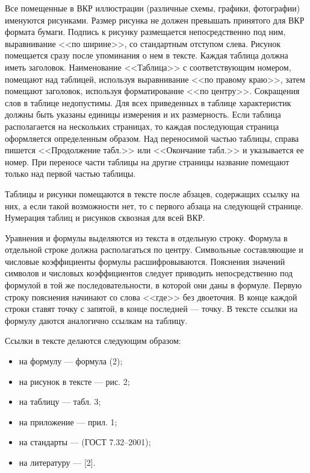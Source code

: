 \documentclass[14pt]{extarticle} %
\begin{document}

Все помещенные в ВКР иллюстрации (различные схемы, графики, фотографии) именуются рисунками. Размер рисунка не должен превышать принятого для ВКР формата бумаги. Подпись к рисунку размещается непосредственно под ним, выравнивание <<по ширине>>, со стандартным отступом слева. Рисунок помещается сразу после упоминания о нем в тексте. Каждая таблица должна иметь заголовок. Наименование <<Таблица>> с соответствующим номером, помещают над таблицей, используя выравнивание <<по правому краю>>, затем помещают заголовок, используя форматирование <<по центру>>. Сокращения слов в таблице недопустимы. Для всех приведенных в таблице характеристик должны быть указаны единицы измерения и их размерность. Если таблица располагается на нескольких страницах, то каждая последующая страница оформляется определенным образом. Над переносимой частью таблицы, справа пишется <<Продолжение табл.>> или <<Окончание табл.>> и указывается ее номер. При переносе части таблицы на другие страницы название помещают только над первой частью таблицы.

Таблицы и рисунки помещаются в тексте после абзацев, содержащих ссылку на них, а если такой возможности нет, то с первого абзаца на следующей странице. Нумерация таблиц и рисунков сквозная для всей ВКР.

Уравнения и формулы выделяются из текста в отдельную строку. Формула в отдельной строке должна располагаться по центру. Символьные составляющие и числовые коэффициенты формулы расшифровываются. Пояснения значений символов и числовых коэффициентов следует приводить непосредственно под формулой в той же последовательности, в которой они даны в формуле. Первую строку пояснения начинают со слова <<где>> без двоеточия. В конце каждой строки ставят точку с запятой, в конце последней --- точку. В тексте ссылки на формулу даются аналогично ссылкам на таблицу.

Ссылки в тексте делаются следующим образом:
\begin{itemize}[label=--]
	\item на формулу --- формула (2);
\item на рисунок в тексте --- рис. 2;
\item на таблицу --- табл. 3;
\item на приложение --- прил. 1;
\item на стандарты --- (ГОСТ 7.32--2001);
\item на литературу --- [2].
\end{itemize}
\end{document}
